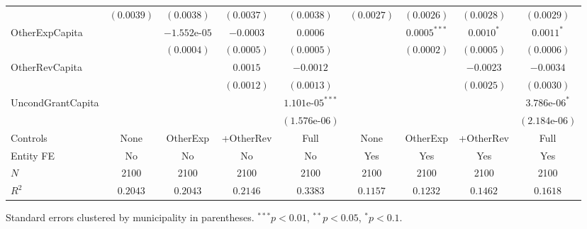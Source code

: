 \documentclass[border=10pt,varwidth=25cm]{standalone}
\renewenvironment{table}[1][]{}{}
\begin{document}
\begin{table}[H]
\begin{minipage}{\textwidth}
\begin{tabular}{lcccccccc}
         & $(0.0039)$ & $(0.0038)$ & $(0.0037)$ & $(0.0038)$ & $(0.0027)$ & $(0.0026)$ & $(0.0028)$ & $(0.0029)$ \\[4pt]
        OtherExpCapita &  & $-1.552\text{e-}05$ & $-0.0003$ & $0.0006$ &  & $0.0005^{***}$ & $0.0010^{*}$ & $0.0011^{*}$ \\
         &  & $(0.0004)$ & $(0.0005)$ & $(0.0005)$ &  & $(0.0002)$ & $(0.0005)$ & $(0.0006)$ \\[4pt]
        OtherRevCapita &  &  & $0.0015$ & $-0.0012$ &  &  & $-0.0023$ & $-0.0034$ \\
         &  &  & $(0.0012)$ & $(0.0013)$ &  &  & $(0.0025)$ & $(0.0030)$ \\[4pt]
        UncondGrantCapita &  &  &  & $1.101\text{e-}05^{***}$ &  &  &  & $3.786\text{e-}06^{*}$ \\
         &  &  &  & $(1.576\text{e-}06)$ &  &  &  & $(2.184\text{e-}06)$ \\[4pt]
        \midrule
        Controls & None & OtherExp & +OtherRev & Full & None & OtherExp & +OtherRev & Full \\
        Entity FE & No & No & No & No & Yes & Yes & Yes & Yes \\
        $N$ & 2100 & 2100 & 2100 & 2100 & 2100 & 2100 & 2100 & 2100 \\
        $R^2$ & $0.2043$ & $0.2043$ & $0.2146$ & $0.3383$ & $0.1157$ & $0.1232$ & $0.1462$ & $0.1618$ \\
        \bottomrule
    \end{tabular}

    \vspace{6pt}
    {\scriptsize Standard errors clustered by municipality in parentheses. $^{***}p<0.01$, $^{**}p<0.05$, $^{*}p<0.1$.}
    \end{minipage}
\end{table}
\end{document}
